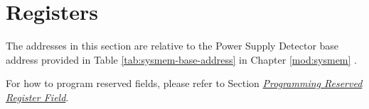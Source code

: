 \documentclass[main\_\_EN.tex]{subfiles}
\begin{document}





\newpage
\section{Registers}

The addresses in this section are relative to the Power Supply Detector base address provided in Table \ref{tab:sysmem-base-address} in Chapter \ref{mod:sysmem} \textit{}.

For how to program reserved fields, please refer to Section \hyperref[programming-reserved-field]{\textit{Programming Reserved Register Field}}.


\end{document}
